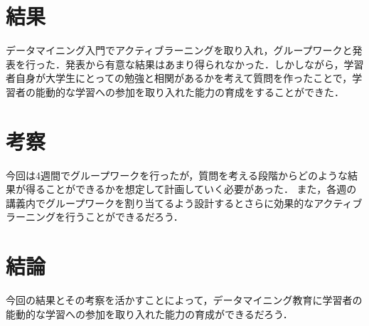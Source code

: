 \documentclass[uplatex,twocolumn,dvipdfmx]{jsarticle}
\begin{document}
\section{結果}

データマイニング入門でアクティブラーニングを取り入れ，グループワークと発表を行った．発表から有意な結果はあまり得られなかった．しかしながら，学習者自身が大学生にとっての勉強と相関があるかを考えて質問を作ったことで，学習者の能動的な学習への参加を取り入れた能力の育成をすることができた．


\section{考察}

今回は4週間でグループワークを行ったが，質問を考える段階からどのような結果が得ることができるかを想定して計画していく必要があった．
また，各週の講義内でグループワークを割り当てるよう設計するとさらに効果的なアクティブラーニングを行うことができるだろう．





\section{結論}

今回の結果とその考察を活かすことによって，データマイニング教育に学習者の能動的な学習への参加を取り入れた能力の育成ができるだろう．



\end{document}
